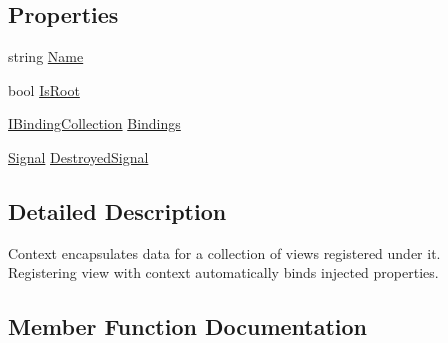 \subsection*{Properties}
\begin{DoxyCompactItemize}
\item 
string \mbox{\hyperlink{interfacecp_games_1_1core_1_1_rapid_m_v_c_1_1_i_context_a75d949e147b0c638729e455a99d361bc}{Name}}
\item 
bool \mbox{\hyperlink{interfacecp_games_1_1core_1_1_rapid_m_v_c_1_1_i_context_ac7e05700419090786a56b92d64a35728}{Is\+Root}}
\item 
\mbox{\hyperlink{interfacecp_games_1_1core_1_1_rapid_m_v_c_1_1_i_binding_collection}{I\+Binding\+Collection}} \mbox{\hyperlink{interfacecp_games_1_1core_1_1_rapid_m_v_c_1_1_i_context_a5aba456e160e86d5da856d6d823ac393}{Bindings}}
\item 
\mbox{\hyperlink{classcp_games_1_1core_1_1_rapid_m_v_c_1_1_signal}{Signal}} \mbox{\hyperlink{interfacecp_games_1_1core_1_1_rapid_m_v_c_1_1_i_context_a59f314929b2f01751bdf6f2a00586e80}{Destroyed\+Signal}}
\end{DoxyCompactItemize}


\subsection{Detailed Description}
Context encapsulates data for a collection of views registered under it. Registering view with context automatically binds injected properties. 



\subsection{Member Function Documentation}
\mbox{\label{interfacecp_games_1_1core_1_1_rapid_m_v_c_1_1_i_context_a5f24672bfe61416bdc05a8e68eb147d0}} 
